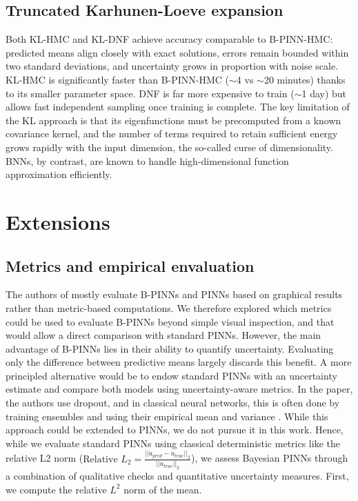\documentclass{article}
\begin{document}
\subsection{Truncated Karhunen-Loeve expansion}
Both KL-HMC and KL-DNF achieve accuracy comparable to B-PINN-HMC: predicted means align closely with exact solutions, errors remain bounded within two standard deviations, and uncertainty grows in proportion with noise scale. KL-HMC is significantly faster than B-PINN-HMC ($\sim$4 vs $\sim$20 minutes) thanks to its smaller parameter space. DNF is far more expensive to train ($\sim$1 day) but allows fast independent sampling once training is complete. The key limitation of the KL approach is that its eigenfunctions must be precomputed from a known covariance kernel, and the number of terms required to retain sufficient energy grows rapidly with the input dimension, the so-called curse of dimensionality. BNNs, by contrast, are known to handle high-dimensional function approximation efficiently.


\section{Extensions}

\subsection{Metrics and empirical envaluation}


The authors of \cite{Yang_2021} mostly evaluate B-PINNs and PINNs based on graphical results rather than metric-based computations. 
We therefore explored which metrics could be used to evaluate B-PINNs beyond simple visual inspection, and that would allow a direct comparison with standard PINNs. However, the main advantage of B-PINNs lies in their ability to quantify uncertainty. Evaluating only the difference between predictive means largely discards this benefit. A more principled alternative would be to endow standard PINNs with an uncertainty estimate and compare both models using uncertainty-aware metrics. In the paper, the authors use dropout, and in classical neural networks, this is often done by training ensembles and using their empirical mean and variance \cite{lakshminarayanan2017simplescalablepredictiveuncertainty}. While this approach could be extended to PINNs, we do not pursue it in this work. Hence, while we evaluate standard PINNs using classical deterministic metrics like the relative L2 norm ($\text{Relative } L_2 = \frac{||u_{pred} - u_{true}||_2}{||u_{true}||_2}$), we assess Bayesian PINNs through a combination of qualitative checks and quantitative uncertainty measures. First, we compute the relative $L^2$ norm of the mean. 
\end{document}
